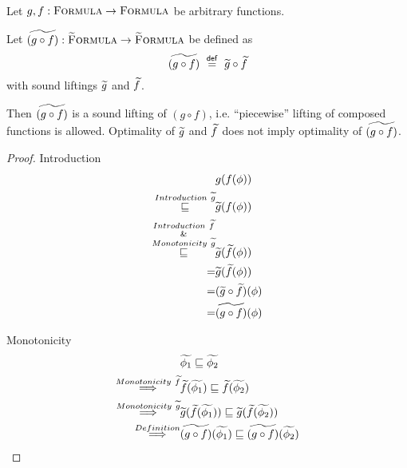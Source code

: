 \begin{lemma}~\\
    Let $g, f : \textup{\textsc{Formula}} \rightarrow \textup{\textsc{Formula}}$ be arbitrary functions.
    
    Let $\widetilde{(g \circ f)} : \textup{\textsc{\ensuremath{\widetilde{\text{F}}}ormula}} \rightarrow \textup{\textsc{\ensuremath{\widetilde{\text{F}}}ormula}}$ be defined as
    \begin{displaymath}
    \widetilde{(g \circ f)} ~\overset{\textup{\textmd{\textsf{def}}}}{=}~ \widetilde{g} \circ \widetilde{f}
    \end{displaymath}
    with sound liftings $\widetilde{g}$ and $\widetilde{f}$.
    
    Then $\widetilde{(g \circ f)}$ is a sound lifting of $(g \circ f)$, i.e. “piecewise” lifting of composed functions is allowed.
    Optimality of $\widetilde{g}$ and $\widetilde{f}$ does not imply optimality of $\widetilde{(g \circ f)}$.
\end{lemma}
\begin{proof}
    Introduction
    \begin{align*}
    &g(f(\phi))\\
    \overset{Introduction~\widetilde{g}}{\sqsubseteq}
    &\widetilde{g}(f(\phi))\\
    \overset{\substack{Introduction~\widetilde{f}\\\&\\Monotonicity~\widetilde{g}}}{\sqsubseteq}
    &\widetilde{g}(\widetilde{f}(\phi))\\
    =
    &\widetilde{g}(\widetilde{f}(\phi))\\
    =
    &(\widetilde{g} \circ \widetilde{f})(\phi)\\
    =
    &\widetilde{(g \circ f)}(\phi)
    \end{align*}
    
    Monotonicity
    \begin{align*}
    &\widetilde{\phi_1} \sqsubseteq \widetilde{\phi_2}\\
    \overset{Monotonicity~\widetilde{f}}{\implies}
    &\widetilde{f}(\widetilde{\phi_1}) \sqsubseteq \widetilde{f}(\widetilde{\phi_2})\\
    \overset{Monotonicity~\widetilde{g}}{\implies}
    &\widetilde{g}(\widetilde{f}(\widetilde{\phi_1})) \sqsubseteq \widetilde{g}(\widetilde{f}(\widetilde{\phi_2}))\\
    \overset{Definition}{\implies}
    &\widetilde{(g \circ f)}(\widetilde{\phi_1}) \sqsubseteq \widetilde{(g \circ f)}(\widetilde{\phi_2})
    \end{align*}
\end{proof}

\begin{comment}
\begin{align*}
\grad{f}(\grad{\phi_1}, \grad{\phi_2}) = \alpha(\{~ \phiAnd{$\phi_1$}{$\phi_2$} ~|~ \phi_1 \in \gamma(\grad{\phi_1}) \wedge \phi_2 \in \gamma(\grad{\phi_2}) ~\})
\end{align*}
\end{comment}





